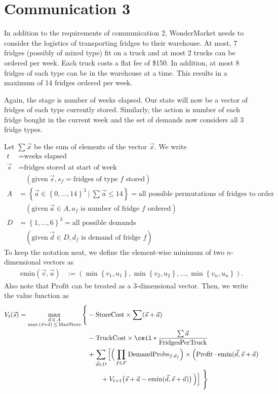 \documentclass[11pt,a4paper]{article}
\begin{document}
\section{Communication 3}
In addition to the requirements of communication 2, WonderMarket 
needs to consider the logistics of transporting fridges to their warehouse. 
At most, 7 fridges (possibly of mixed type) fit on a truck and at most 2 trucks 
can be ordered per week. Each truck costs a flat fee of \$150. In 
addition, at most 8 fridges of each type can be in the warehouse at a time. 
This results in a maximum of 14 fridges ordered per week.

Again, the stage is number of weeks elapsed. Our state will now be a 
vector of fridges of each type currently stored. 
Similarly, the action is number of each fridge bought in the current week
and the set of demands now considers all 3 fridge types.

Let $\sum \vec x$ be the sum of elements of the vector $\vec x$. 
We write 
\begin{align*}
    t &= \text{weeks elapsed} \\ 
    \vec s &= \text{fridges stored at start of week} \\ 
    & \quad (\text{given}~\vec s, s_f = \text{fridges of type $f$ stored}) \\ 
    A &= \left\{ \vec a \in \left\{ 0, \ldots, 14\right\}^3 ~|~ \sum \vec a \le 14 \right\}  = \text{all possible permutations of fridges to order} \\ 
    & \quad (\text{given}~\vec a \in A, a_f \text{ is number of fridge $f$ ordered}) \\
    D &= \left\{ 1, \ldots, 6\right\}^3 = \text{all possible demands}  \\ 
    & \quad (\text{given}~\vec d \in D, d_f \text{ is demand of fridge $f$}) 
\end{align*}
To keep the notation neat, we define the 
element-wise minimum of two $n$-dimensional vectors as 
\begin{align*}
     \mathrm{emin}( \vec v, \vec u ) &:= \left( \min \left\{ v_1, u_1 \right\}, \min \left\{ v_2, u_2 \right\}, \ldots, \min \left\{ v_n, u_n \right\} \right).
\end{align*}
Also note that $\mathrm{Profit}$ can be treated as a 3-dimensional vector. 
Then, we write the value function as 
\begin{align*}
    V_{t}(\vec s) = 
    \max_{ \substack{\vec a \,\in\, A \\ \max \,(\vec s + \vec a)\, \le\, \mathrm{MaxStore} } }\Bigg\{& 
        -\mathrm{StoreCost}\times\sum(\vec s + \vec a) \\ 
        &-\mathrm{TruckCost}\times \ceil*{\frac{\sum \vec a}{\mathrm{FridgesPerTruck}}} \\ 
        & + \sum_{\vec d \in D} \Big[\Big(\prod_{f \in F}\mathrm{DemandProbs}_{f,d_f} \Big)\times \Big( \mathrm{Profit} \cdot \mathrm{emin} ( \vec d, \vec s + \vec a)   \\ 
        & \qquad + V_{t+1} \big(\vec s + \vec a - \mathrm{emin} (\vec d, \vec s + \vec a)\big)\,\Big) \Big]\,\,\Bigg\}
\end{align*}
\end{document}
